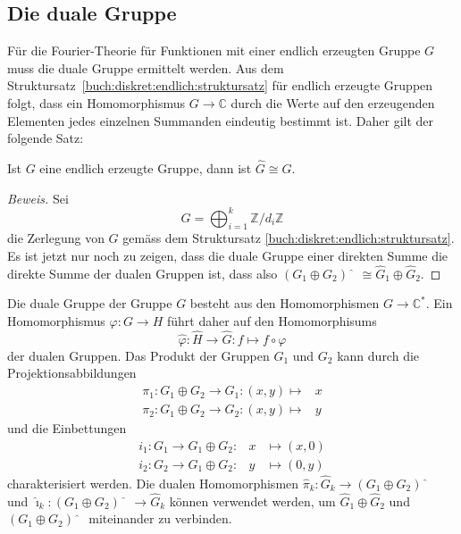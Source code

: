 %
%
\subsection{Die duale Gruppe
\label{buch:diskret:endlich:subsection:dual}}
Für die Fourier-Theorie für Funktionen mit einer endlich erzeugten
Gruppe $G$ muss die duale Gruppe ermittelt werden.
Aus dem Struktursatz~\ref{buch:diskret:endlich:struktursatz}
für endlich erzeugte Gruppen folgt, dass ein Homomorphismus
$G\to\mathbb{C}$ durch die Werte auf den erzeugenden Elementen
jedes einzelnen Summanden eindeutig bestimmt ist.
Daher gilt der folgende Satz:

\begin{satz}
Ist $G$ eine endlich erzeugte Gruppe, dann ist
$\hat{G}\cong G$.
\end{satz}

\begin{proof}[Beweis]
Sei
\[
G
=
\bigoplus_{i=1}^k \mathbb{Z}/d_i\mathbb{Z}
\]
die Zerlegung von $G$ gemäss dem Struktursatz
\ref{buch:diskret:endlich:struktursatz}.
Es ist jetzt nur noch zu zeigen, dass die duale Gruppe einer direkten
Summe die direkte Summe der dualen Gruppen ist, dass also
$(G_1\oplus G_2)\hat{\phantom{\imath}} \cong \hat{G}_1\oplus \hat{G}_2$.
\end{proof}

Die duale Gruppe der Gruppe $G$ besteht aus den Homomorphismen
$G\to\mathbb{C}^*$.
Ein Homomorphismus $\varphi\colon G\to H$ führt daher auf den
Homomorphisums
\[
\hat{\varphi}
\colon
\hat{H}\to\hat{G}
:
f\mapsto f\circ \varphi
\]
der dualen Gruppen.
Das Produkt der Gruppen $G_1$ und $G_2$ kann durch die Projektionsabbildungen
\[
\renewcommand{\arraycolsep}{2pt}
\begin{array}{rl}
\pi_1 \colon G_1 \oplus G_2 \to G_1 : (x,y) \mapsto {}&x
\\
\pi_2 \colon G_1 \oplus G_2 \to G_2 : (x,y) \mapsto {}&y
\end{array}
\]
und die Einbettungen
\[
\renewcommand{\arraycolsep}{2pt}
\begin{array}{rcl}
i_1 \colon G_1 \to G_1\oplus G_2 : &x&\mapsto (x,0) \\
i_2 \colon G_2 \to G_1\oplus G_2 : &y&\mapsto (0,y) 
\end{array}
\]
charakterisiert werden.
Die dualen Homomorphismen
$\hat{\pi}_k\colon\hat{G}_k\to (G_1\oplus G_2)\hat{\phantom{\imath}}$
und
$\hat{\imath}_k\colon (G_1\oplus G_2)\hat{\phantom{\imath}}\to\hat{G}_k$
können verwendet werden, um $\hat{G}_1\oplus\hat{G}_2$ und
$(G_1\oplus G_2)\hat{\phantom{\imath}}$ miteinander zu verbinden.

